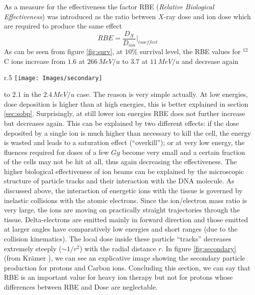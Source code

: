 \documentclass[12pt, a4paper, twoside]{book}
\begin{document}
As a measure for the effectiveness the factor RBE (\emph{Relative Biological Effectiveness}) was introduced as the ratio between $X$-ray dose and ion dose which are required to produce the same effect
\[
RBE = \frac{D_X}{D_{ion}}\Bigg|_{isoeffect}
\]
As can be seen from figure \ref{fig:surv}, at $10\%$ survival level, the RBE values for $^{12}$C ions increase from $1.6$ at $266\,MeV/u$ to $3.7$ at $11\,MeV/u$ and decrease again  
\begin{wrapfigure}{r}{.5\textwidth}
\centering
{\texttt{[image: Images/secondary]}}
\caption{Monte-Carlo simulations showing individual tracks of $\delta$-electrons produced by energetic protons and $^{12}C$ ions penetrating tissue}
\label{fig:secondary}
\end{wrapfigure}
\noindent to $2.1$ in the $2.4\,MeV/u$ case. The reason is very simple actually. At low energies, dose deposition is higher than at high energies, this is better explained in section \ref{sec:sobp}.
Surprisingly, at still lower ion energies RBE does not further increase but decreases again. This can be
explained by two different effects: if the dose deposited by a single ion is much higher than necessary to kill the cell, the energy is wasted and leads to a saturation effect (``overkill''); or at very low energy, the fluences required for doses of a few $Gy$ become very small and a certain fraction of the cells may not be hit at all, thus again decreasing the effectiveness.
The higher biological effectiveness of ion beams can be explained by the microscopic structure of particle tracks and their interaction with the DNA molecule. As discussed above, the interaction of energetic ions with the tissue is governed by inelastic collisions with the atomic electrons. Since the ion/electron mass ratio is very large, the ions are moving on practically straight trajectories through the tissue.
Delta-electrons are emitted mainly in forward direction and those emitted at larger angles have comparatively low energies and short ranges (due to the collision kinematics). The local dose inside these particle ``tracks'' decreases extremely steeply ($\sim1/r^2$) with the radial distance $r$. In figure \ref{fig:secondary} (from Kr\"amer \cite{Kram:track}), we can see an explicative image showing the secondary particle production for protons and Carbon ions.
Concluding this section, we can say that RBE is an important value for heavy ion therapy but not for protons whose differences between RBE and Dose are neglectable.
\end{document}
